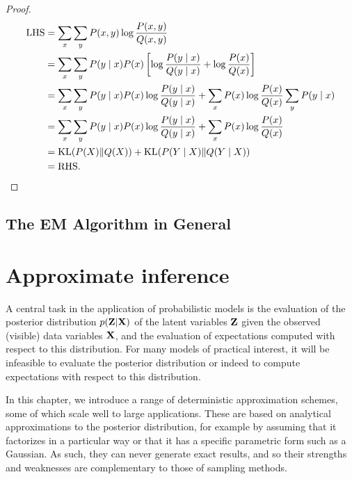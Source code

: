 \documentclass[a4paper]{article}
\begin{document}
\begin{proof}
\[
\begin{aligned}
  \text{LHS} &= \sum_x \sum_y P(x,y) \log \frac{P(x,y)}{Q(x,y)} \\
  &= \sum_x \sum_y P(y \mid x) P(x) \left[ \log 
  \frac{P(y \mid x)}{Q(y \mid x)} + \log \frac{P(x)}{Q(x)} \right] \\
  &= \sum_x \sum_y P(y \mid x) P(x) \log 
  \frac{P(y \mid x)}{Q(y \mid x)} + \sum_x P(x) \log 
  \frac{P(x)}{Q(x)} \sum_y P(y \mid x) \\
  &= \sum_x \sum_y P(y \mid x) P(x) \log \frac{P(y \mid x)}
  {Q(y \mid x)} + \sum_x P(x) \log \frac{P(x)}{Q(x)} \\
  &= \operatorname{KL}({P(X)} \Vert {Q(X)}) + \operatorname{KL}({P(Y \mid X)} \Vert {Q(Y \mid X)}) \\
  &= \text{RHS}.
\end{aligned}
\]
\end{proof}

\subsection{The EM Algorithm in General}

\section{Approximate inference} 
A central task in the application of probabilistic models is 
the evaluation of the posterior distribution $p(\boldsymbol{\mathbf{Z}}|\boldsymbol{\mathbf{X}})$ of the 
latent variables $\boldsymbol{\mathbf{Z}}$ given the observed (visible) data variables 
$\boldsymbol{\mathbf{X}}$, and the evaluation of expectations computed with respect 
to this distribution. For many models of practical interest, 
it will be infeasible 
to evaluate the posterior distribution or indeed to compute 
expectations with respect to this distribution.

In this chapter, we introduce a range of deterministic 
approximation schemes, some of which scale well to large 
applications. These are based on analytical approximations 
to the posterior distribution, for example by assuming that 
it factorizes in a particular way or that it has a specific 
parametric form such as a Gaussian. As such, they can never 
generate exact results, and so their strengths and weaknesses 
are complementary to those of sampling methods.
\end{document}
